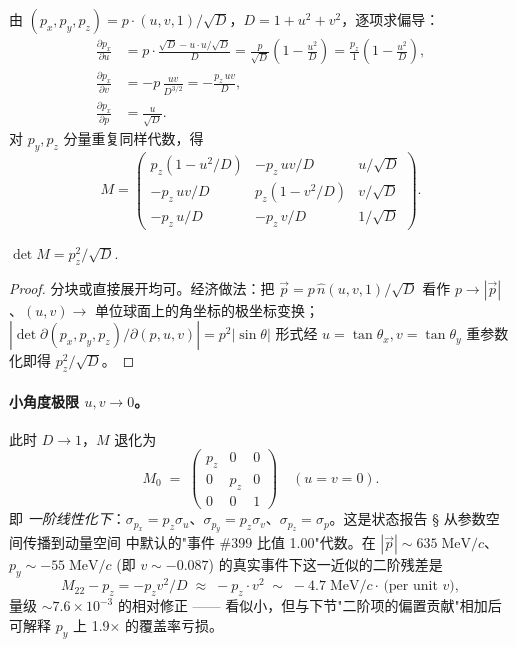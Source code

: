 由 $(p_x,p_y,p_z)=p\cdot(u,v,1)/\sqrt{D}$，$D=1+u^2+v^2$，逐项求偏导：
\begin{align}
  \frac{\partial p_x}{\partial u}&= p\!\cdot\!\frac{\sqrt D - u\cdot u/\sqrt D}{D}
                                 = \frac{p}{\sqrt D}\!\left(1-\frac{u^2}{D}\right)
                                 = \frac{p_z}{1}\!\left(1-\frac{u^2}{D}\right),\\[2pt]
  \frac{\partial p_x}{\partial v}&= -p\,\frac{uv}{D^{3/2}} = -\frac{p_z\,uv}{D},\\
  \frac{\partial p_x}{\partial p}&= \frac{u}{\sqrt D}.
\end{align}
对 $p_y,p_z$ 分量重复同样代数，得
\begin{equation}
  \boxed{\;M = \begin{pmatrix}
    p_z\!\left(1-u^2/D\right) & -p_z\,uv/D & u/\sqrt D \\
    -p_z\,uv/D & p_z\!\left(1-v^2/D\right) & v/\sqrt D \\
    -p_z\,u/D & -p_z\,v/D & 1/\sqrt D
  \end{pmatrix}.\;}
  \label{eq:partIa:fisher:M}
\end{equation}

\begin{lemma}[$M$ 的行列式]\label{lem:partIa:fisher:detM}
  $\det M = p_z^2/\sqrt D$.
\end{lemma}
\begin{proof}
  分块或直接展开均可。经济做法：把 $\vec p=p\,\hat n(u,v,1)/\sqrt D$ 看作 $p\to|\vec p|$、$(u,v)\to$ 单位球面上的角坐标的极坐标变换；$|\det\partial(p_x,p_y,p_z)/\partial(p,u,v)|=p^2|\sin\theta|$ 形式经 $u=\tan\theta_x,v=\tan\theta_y$ 重参数化即得 $p_z^2/\sqrt D$。
\end{proof}

\paragraph{小角度极限 $u,v\to 0$。} 此时 $D\to 1$，$M$ 退化为
\begin{equation}
  M_0 \;=\;\begin{pmatrix}p_z & 0 & 0\\ 0 & p_z & 0\\ 0 & 0 & 1\end{pmatrix}\quad(u=v=0).
  \label{eq:partIa:fisher:M_smallangle}
\end{equation}
即 \emph{一阶线性化下}：$\sigma_{p_x}=p_z\sigma_u$、$\sigma_{p_y}=p_z\sigma_v$、$\sigma_{p_z}=\sigma_p$。这是状态报告 \StatusReport § 从参数空间传播到动量空间 中默认的"事件 \#399 比值 1.00"代数。在 $|\vec p|\sim 635\;\mathrm{MeV}/c$、$p_y\sim -55\;\mathrm{MeV}/c$ (即 $v\sim -0.087$) 的真实事件下这一近似的二阶残差是
\begin{equation}
  M_{22}-p_z = -p_z v^2/D \;\approx\; -p_z\cdot v^2 \;\sim\;-4.7\;\mathrm{MeV}/c\cdot\,\text{(per unit }v\text{)},
\end{equation}
量级 $\sim 7.6\times 10^{-3}$ 的相对修正 —— 看似小，但与下节"二阶项的偏置贡献"相加后可解释 $p_y$ 上 1.9× 的覆盖率亏损。

